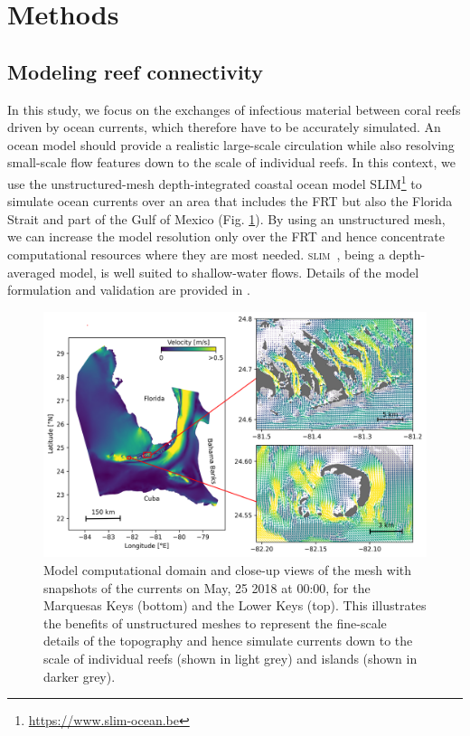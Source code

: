\documentclass[utf8]{frontiersSCNS}
\newcommand{\slim}{\textsc{slim}\ }
\newcommand{\dan}[1]{\textbf{\textcolor{orange}{#1}}}
\begin{document}
\section{Methods}

\subsection{Modeling reef connectivity}
In this study, we focus on the exchanges of infectious material between coral reefs driven by ocean currents, which therefore have to be accurately simulated. An ocean model should provide a realistic large-scale circulation while also resolving small-scale flow features down to the scale of individual reefs. In this context, we use the unstructured-mesh depth-integrated coastal ocean model SLIM\footnote{\url{https://www.slim-ocean.be}} to simulate ocean currents over an area that includes the FRT but also the Florida Strait and part of the Gulf of Mexico (Fig. \ref{fig:setup}). By using an unstructured mesh, we can increase the model resolution only over the FRT and hence concentrate computational resources where they are most needed. \slim, being a depth-averaged model, is well suited to shallow-water flows. Details of the model formulation and validation are provided in \cite{frys20}. 

\begin{figure}
    \centering
    \includegraphics[width=.95\textwidth]{figures/vel.png}
    \caption{Model computational domain and close-up views of the mesh with snapshots of the currents on May, 25 2018 at 00:00, for the Marquesas Keys (bottom) and the Lower Keys (top). This illustrates the benefits of unstructured meshes to represent the fine-scale details of the topography and hence simulate currents down to the scale of individual reefs (shown in light grey) and islands (shown in darker grey).}
    \label{fig:setup}
\end{figure}
\end{document}
